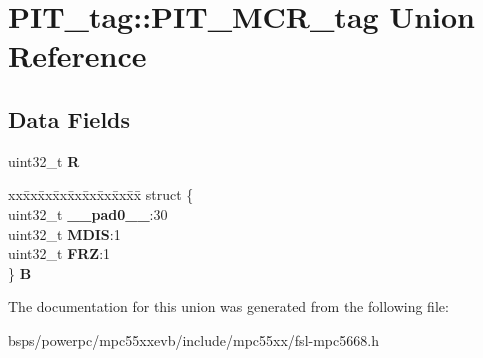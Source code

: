 \hypertarget{unionPIT__tag_1_1PIT__MCR__tag}{}\section{P\+I\+T\+\_\+tag\+::P\+I\+T\+\_\+\+M\+C\+R\+\_\+tag Union Reference}
\label{unionPIT__tag_1_1PIT__MCR__tag}
\subsection*{Data Fields}
\begin{DoxyCompactItemize}
\item 
\mbox{\label{unionPIT__tag_1_1PIT__MCR__tag_a084dea8a7af211f36c71e833a2f0275f}} 
uint32\+\_\+t {\bfseries R}
\item 
\mbox{\label{unionPIT__tag_1_1PIT__MCR__tag_ac923d48a6ba97af5b1fa9bb1e7b681f0}} 
\begin{tabbing}
xx\=xx\=xx\=xx\=xx\=xx\=xx\=xx\=xx\=\kill
struct \{\\
\>uint32\_t {\bfseries \_\_pad0\_\_}:30\\
\>uint32\_t {\bfseries MDIS}:1\\
\>uint32\_t {\bfseries FRZ}:1\\
\} {\bfseries B}\\

\end{tabbing}\end{DoxyCompactItemize}


The documentation for this union was generated from the following file\+:\begin{DoxyCompactItemize}
\item 
bsps/powerpc/mpc55xxevb/include/mpc55xx/fsl-\/mpc5668.\+h\end{DoxyCompactItemize}
